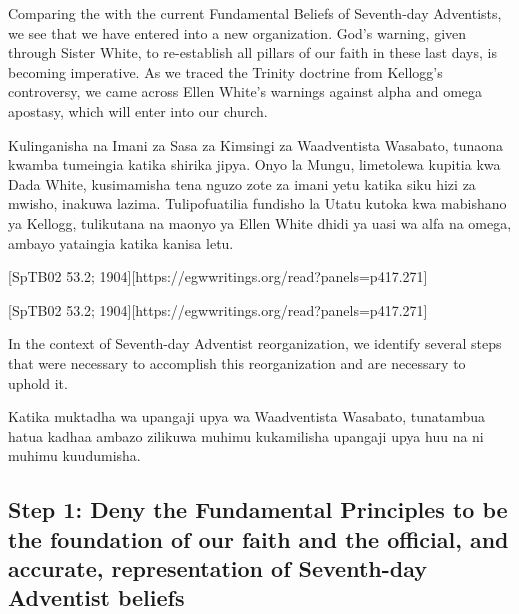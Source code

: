 Comparing the  with the current Fundamental Beliefs of Seventh-day Adventists, we see that we have entered into a new organization. God’s warning, given through Sister White, to re-establish all pillars of our faith in these last days, is becoming imperative. As we traced the Trinity doctrine from Kellogg's controversy, we came across Ellen White’s warnings against alpha and omega apostasy, which will enter into our church.


Kulinganisha  na Imani za Sasa za Kimsingi za Waadventista Wasabato, tunaona kwamba tumeingia katika shirika jipya. Onyo la Mungu, limetolewa kupitia kwa Dada White, kusimamisha tena nguzo zote za imani yetu katika siku hizi za mwisho, inakuwa lazima. Tulipofuatilia fundisho la Utatu kutoka kwa mabishano ya Kellogg, tulikutana na maonyo ya Ellen White dhidi ya uasi wa alfa na omega, ambayo yataingia katika kanisa letu.


[SpTB02 53.2; 1904][https://egwwritings.org/read?panels=p417.271]


[SpTB02 53.2; 1904][https://egwwritings.org/read?panels=p417.271]


In the context of Seventh-day Adventist reorganization, we identify several steps that were necessary to accomplish this reorganization and are necessary to uphold it.


Katika muktadha wa upangaji upya wa Waadventista Wasabato, tunatambua hatua kadhaa ambazo zilikuwa muhimu kukamilisha upangaji upya huu na ni muhimu kuudumisha.


\subsection*{Step 1: Deny the Fundamental Principles to be the foundation of our faith and the official, and accurate, representation of Seventh-day Adventist beliefs}


